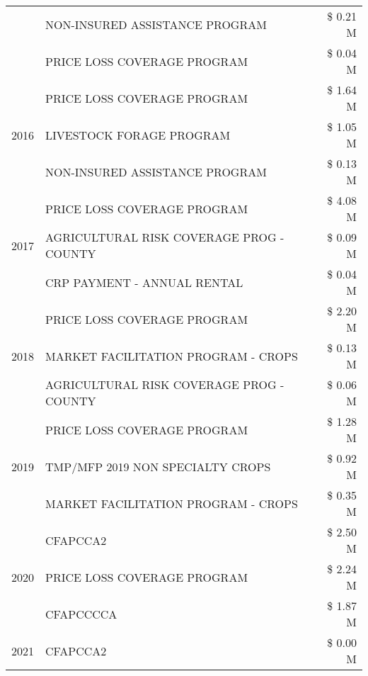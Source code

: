 \begin{tabular}{llr}
 & NON-INSURED ASSISTANCE PROGRAM & \$ 0.21 M \\
 & PRICE LOSS COVERAGE PROGRAM & \$ 0.04 M \\
\cline{1-3}
\multirow[t]{3}{*}{2016} & PRICE LOSS COVERAGE PROGRAM & \$ 1.64 M \\
 & LIVESTOCK FORAGE PROGRAM & \$ 1.05 M \\
 & NON-INSURED ASSISTANCE PROGRAM & \$ 0.13 M \\
\cline{1-3}
\multirow[t]{3}{*}{2017} & PRICE LOSS COVERAGE PROGRAM & \$ 4.08 M \\
 & AGRICULTURAL RISK COVERAGE PROG - COUNTY & \$ 0.09 M \\
 & CRP PAYMENT - ANNUAL RENTAL & \$ 0.04 M \\
\cline{1-3}
\multirow[t]{3}{*}{2018} & PRICE LOSS COVERAGE PROGRAM & \$ 2.20 M \\
 & MARKET FACILITATION PROGRAM - CROPS & \$ 0.13 M \\
 & AGRICULTURAL RISK COVERAGE PROG - COUNTY & \$ 0.06 M \\
\cline{1-3}
\multirow[t]{3}{*}{2019} & PRICE LOSS COVERAGE PROGRAM & \$ 1.28 M \\
 & TMP/MFP 2019 NON SPECIALTY CROPS & \$ 0.92 M \\
 & MARKET FACILITATION PROGRAM - CROPS & \$ 0.35 M \\
\cline{1-3}
\multirow[t]{3}{*}{2020} & CFAPCCA2 & \$ 2.50 M \\
 & PRICE LOSS COVERAGE PROGRAM & \$ 2.24 M \\
 & CFAPCCCCA & \$ 1.87 M \\
\cline{1-3}
2021 & CFAPCCA2 & \$ 0.00 M \\
\cline{1-3}
\bottomrule
\end{tabular}

